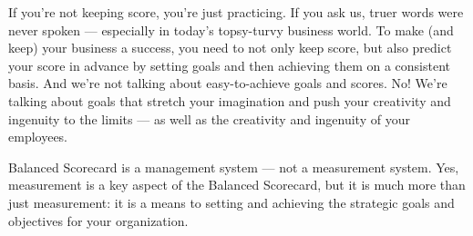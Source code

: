 \documentclass[a4paper,twoside,12pt]{article}
\begin{document}
\epigraph{If you’re not keeping score, you’re
	just practicing. If you ask us, truer words were never spoken — especially
	in today’s topsy-turvy business world. To make (and keep) your business a
	success, you need to not only keep score, but also predict your score in advance
	by setting goals and then achieving them on a consistent basis. And we’re not
	talking about easy-to-achieve goals and scores. No! We’re talking about goals
	that stretch your imagination and push your creativity and ingenuity to the
	limits — as well as the creativity and ingenuity of your employees.}{}

\epigraph{Balanced
	Scorecard is a management system — not a measurement system. Yes, measurement
	is a key aspect of the Balanced Scorecard, but it is much more than
	just measurement: it is a means to setting and achieving the strategic goals
	and objectives for your organization.}{}
\end{document}

